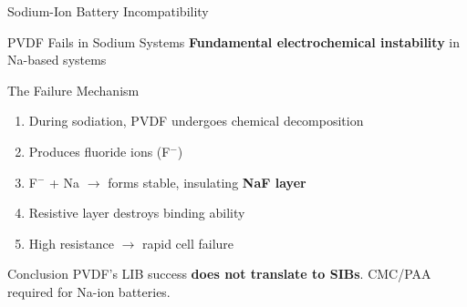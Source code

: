 \documentclass[aspectratio=169]{beamer}
\begin{document}
\begin{frame}{Sodium-Ion Battery Incompatibility}
    \begin{alertblock}{PVDF Fails in Sodium Systems}
        \textbf{Fundamental electrochemical instability} in Na-based systems
    \end{alertblock}
    
    \begin{block}{The Failure Mechanism}
        \begin{enumerate}
            \item During sodiation, PVDF undergoes chemical decomposition
            \item Produces fluoride ions (F$^-$)
            \item F$^-$ + Na $\rightarrow$ forms stable, insulating \textbf{NaF layer}
            \item Resistive layer destroys binding ability
            \item High resistance $\rightarrow$ rapid cell failure
        \end{enumerate}
    \end{block}
    
    \begin{exampleblock}{Conclusion}
        PVDF's LIB success \textbf{does not translate to SIBs}. CMC/PAA required for Na-ion batteries.
    \end{exampleblock}
\end{frame}
\end{document}
